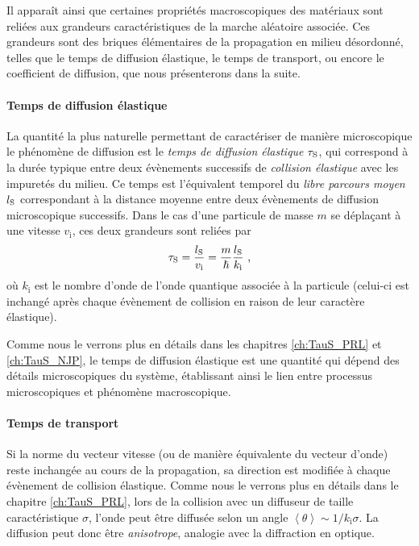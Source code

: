 Il apparaît ainsi que certaines propriétés macroscopiques des matériaux sont reliées aux grandeurs caractéristiques de la marche aléatoire associée. Ces grandeurs sont des briques élémentaires de la propagation en milieu désordonné, telles que le temps de diffusion élastique, le temps de transport, ou encore le coefficient de diffusion, que nous présenterons dans la suite.

\paragraph*{Temps de diffusion élastique}
La quantité la plus naturelle permettant de caractériser de manière microscopique le phénomène de diffusion est le \emph{temps de diffusion élastique} $\tau_{\mathrm{S}}$, qui correspond à la durée typique entre deux évènements successifs de \emph{collision élastique} avec les impuretés du milieu. Ce temps est l'équivalent temporel du \emph{libre parcours moyen}  $l_{\mathrm{S}}$ correspondant à la distance moyenne entre deux évènements de diffusion microscopique successifs. Dans le cas d'une particule de masse $m$ se déplaçant à une vitesse $v_{\mathrm{i}}$, ces deux grandeurs sont reliées par
\begin{equation}
\tau_{\mathrm{S}}=\frac{l_{\mathrm{S}}}{v_{\mathrm{i}}}=\frac{m}{\hslash} \frac{l_{\mathrm{S}}}{k_{\mathrm{i}}} \text{ ,}
\end{equation}
où $k_{\mathrm{i}}$ est le nombre d'onde de l'onde quantique associée à la particule (celui-ci est inchangé après chaque évènement de collision en raison de leur caractère élastique). 

Comme nous le verrons plus en détails dans les chapitres \ref{ch:TauS_PRL} et \ref{ch:TauS_NJP}, le temps de diffusion élastique est une quantité qui dépend des détails microscopiques du système, établissant ainsi le lien entre processus microscopiques et phénomène macroscopique.


\paragraph*{Temps de transport}
Si la norme du vecteur vitesse (ou de manière équivalente du vecteur d'onde) reste inchangée au cours de la propagation, sa direction est modifiée à chaque évènement de collision élastique. Comme nous le verrons plus en détails dans le chapitre \ref{ch:TauS_PRL}, lors de la collision avec un diffuseur de taille caractéristique $\sigma$, l'onde peut être diffusée selon un angle $\left\langle\theta\right\rangle\sim 1/k_{\mathrm{i}} \sigma$. La diffusion peut donc être \emph{anisotrope}, analogie avec la diffraction en optique.


